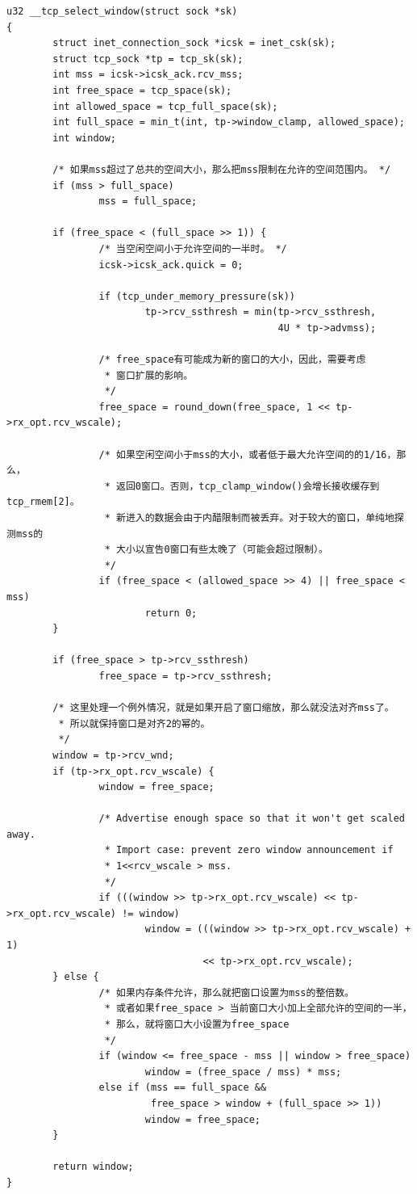 \documentclass[11pt, a4paper,oneside]{book}
\theoremstyle{ocrenumbox}
\theoremstyle{purplenumbox}
\theoremstyle{blackbox}
\begin{document}
\begin{verbatim}
u32 __tcp_select_window(struct sock *sk)
{
        struct inet_connection_sock *icsk = inet_csk(sk);
        struct tcp_sock *tp = tcp_sk(sk);
        int mss = icsk->icsk_ack.rcv_mss;
        int free_space = tcp_space(sk);
        int allowed_space = tcp_full_space(sk);
        int full_space = min_t(int, tp->window_clamp, allowed_space);
        int window;

        /* 如果mss超过了总共的空间大小，那么把mss限制在允许的空间范围内。 */
        if (mss > full_space)
                mss = full_space;

        if (free_space < (full_space >> 1)) {
                /* 当空闲空间小于允许空间的一半时。 */
                icsk->icsk_ack.quick = 0;

                if (tcp_under_memory_pressure(sk))
                        tp->rcv_ssthresh = min(tp->rcv_ssthresh,
                                               4U * tp->advmss);

                /* free_space有可能成为新的窗口的大小，因此，需要考虑
                 * 窗口扩展的影响。
                 */
                free_space = round_down(free_space, 1 << tp->rx_opt.rcv_wscale);

                /* 如果空闲空间小于mss的大小，或者低于最大允许空间的的1/16，那么，
                 * 返回0窗口。否则，tcp_clamp_window()会增长接收缓存到tcp_rmem[2]。
                 * 新进入的数据会由于内醋限制而被丢弃。对于较大的窗口，单纯地探测mss的
                 * 大小以宣告0窗口有些太晚了（可能会超过限制）。
                 */
                if (free_space < (allowed_space >> 4) || free_space < mss)
                        return 0;
        }

        if (free_space > tp->rcv_ssthresh)
                free_space = tp->rcv_ssthresh;

        /* 这里处理一个例外情况，就是如果开启了窗口缩放，那么就没法对齐mss了。
         * 所以就保持窗口是对齐2的幂的。
         */
        window = tp->rcv_wnd;
        if (tp->rx_opt.rcv_wscale) {
                window = free_space;

                /* Advertise enough space so that it won't get scaled away.
                 * Import case: prevent zero window announcement if
                 * 1<<rcv_wscale > mss.
                 */
                if (((window >> tp->rx_opt.rcv_wscale) << tp->rx_opt.rcv_wscale) != window)
                        window = (((window >> tp->rx_opt.rcv_wscale) + 1)
                                  << tp->rx_opt.rcv_wscale);
        } else {
                /* 如果内存条件允许，那么就把窗口设置为mss的整倍数。
                 * 或者如果free_space > 当前窗口大小加上全部允许的空间的一半，
                 * 那么，就将窗口大小设置为free_space
                 */
                if (window <= free_space - mss || window > free_space)
                        window = (free_space / mss) * mss;
                else if (mss == full_space &&
                         free_space > window + (full_space >> 1))
                        window = free_space;
        }

        return window;
}
\end{verbatim}
\end{document}
